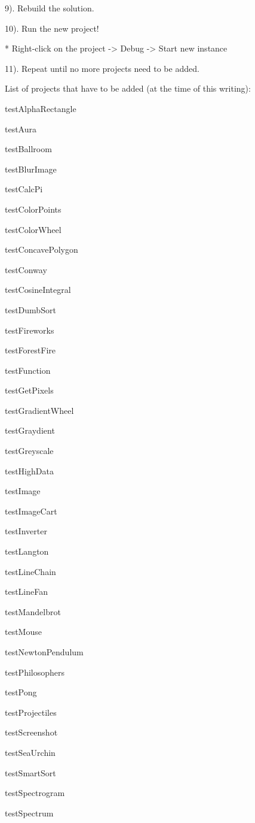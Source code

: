 9). Rebuild the solution.

10). Run the new project! \begin{DoxyVerb}* Right-click on the project -> Debug -> Start new instance
\end{DoxyVerb}


11). Repeat until no more projects need to be added.

List of projects that have to be added (at the time of this writing)\-:

test\-Alpha\-Rectangle

test\-Aura

test\-Ballroom

test\-Blur\-Image

test\-Calc\-Pi

test\-Color\-Points

test\-Color\-Wheel

test\-Concave\-Polygon

test\-Conway

test\-Cosine\-Integral

test\-Dumb\-Sort

test\-Fireworks

test\-Forest\-Fire

test\-Function

test\-Get\-Pixels

test\-Gradient\-Wheel

test\-Graydient

test\-Greyscale

test\-High\-Data

test\-Image

test\-Image\-Cart

test\-Inverter

test\-Langton

test\-Line\-Chain

test\-Line\-Fan

test\-Mandelbrot

test\-Mouse

test\-Newton\-Pendulum

test\-Philosophers

test\-Pong

test\-Projectiles

test\-Screenshot

test\-Sea\-Urchin

test\-Smart\-Sort

test\-Spectrogram

test\-Spectrum

